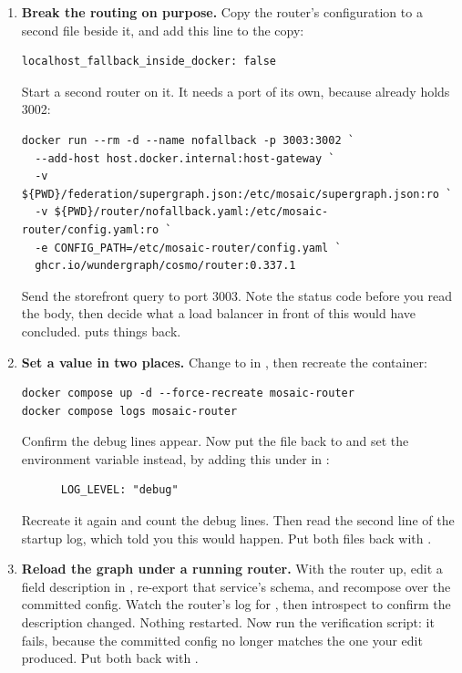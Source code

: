 \begin{enumerate}
  \item \textbf{Break the routing on purpose.} Copy the router's configuration
  to a second file beside it, and add this line to the copy:

  \begin{verbatim}
localhost_fallback_inside_docker: false
  \end{verbatim}

  Start a second router on it. It needs a port of its own, because
   already holds 3002:

  \begin{verbatim}
docker run --rm -d --name nofallback -p 3003:3002 `
  --add-host host.docker.internal:host-gateway `
  -v ${PWD}/federation/supergraph.json:/etc/mosaic/supergraph.json:ro `
  -v ${PWD}/router/nofallback.yaml:/etc/mosaic-router/config.yaml:ro `
  -e CONFIG_PATH=/etc/mosaic-router/config.yaml `
  ghcr.io/wundergraph/cosmo/router:0.337.1
  \end{verbatim}

  Send the storefront query to port 3003. Note the status code before you read
  the body, then decide what a load balancer in front of this would have
  concluded.  puts things back.

  \item \textbf{Set a value in two places.} Change  to
   in , then recreate the container:

  \begin{verbatim}
docker compose up -d --force-recreate mosaic-router
docker compose logs mosaic-router
  \end{verbatim}

  Confirm the debug lines appear. Now put the file back to  and set
  the environment variable instead, by adding this under 
  in :

  \begin{verbatim}
      LOG_LEVEL: "debug"
  \end{verbatim}

  Recreate it again and count the debug lines. Then read the second line of the
  startup log, which told you this would happen. Put both files back with
  .

  \item \textbf{Reload the graph under a running router.} With the router up,
  edit a field description in , re-export that
  service's schema, and recompose over the committed config. Watch the router's
  log for , then introspect to confirm the
  description changed. Nothing restarted. Now run the verification script: it
  fails, because the committed config no longer matches the one your edit
  produced. Put both back with .


\end{enumerate}
